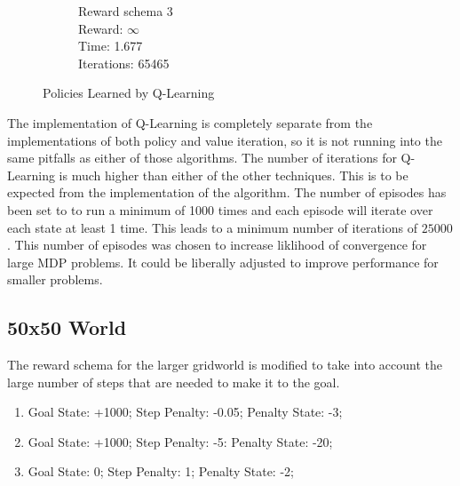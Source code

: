 \documentclass[a4paper,10pt]{article}
\begin{document}
\begin{figure}[H]
\begin{subfigure}[b]{0.3\textwidth}
                \caption{Reward schema 3 \\
                Reward: $\infty$\\
                Time: 1.677 \\
                Iterations: 65465 }
                \label{fig:q3}
        \end{subfigure}
        \caption{Policies Learned by Q-Learning}\label{fig:animals}
\end{figure}

The implementation of Q-Learning is completely separate from the implementations of both policy and value iteration, so it is not running into the same pitfalls as either of those algorithms. The number of iterations for Q-Learning is much higher than either of the other techniques. This is to be expected from the implementation of the algorithm. The number of episodes has been set to to run a minimum of 1000 times and each episode will iterate over each state at least 1 time. This leads to a minimum number of iterations of $25000$. This number of episodes was chosen to increase liklihood of convergence for large MDP problems. It could be liberally adjusted to improve performance for smaller problems.
\subsection{50x50 World}

The reward schema for the larger gridworld is modified to take into account the large number of steps that are needed to make it to the goal. 

\begin{enumerate}
\item Goal State: +1000; Step Penalty: -0.05; Penalty State: -3;
\item Goal State: +1000; Step Penalty: -5: Penalty State: -20;
\item Goal State: 0; Step Penalty: 1; Penalty State: -2;
\end{enumerate}
\end{document}
